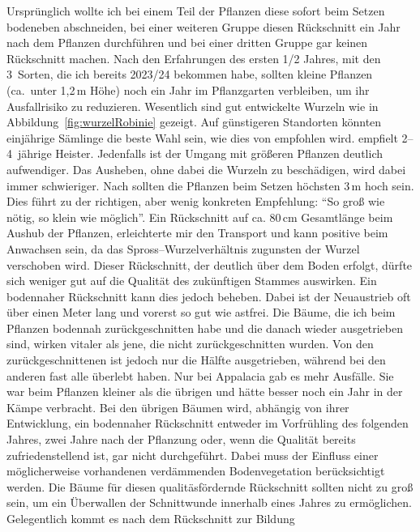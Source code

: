 \documentclass[twocolumn]{scrartcl}
\begin{document}
Ursprünglich wollte ich bei einem Teil der Pflanzen diese sofort beim
Setzen bodeneben abschneiden, bei einer weiteren Gruppe diesen
Rückschnitt ein Jahr nach dem Pflanzen durchführen und bei einer
dritten Gruppe gar keinen Rückschnitt machen. Nach den Erfahrungen des
ersten 1/2 Jahres, mit den 3~Sorten, die ich bereits 2023/24 bekommen
habe, sollten kleine Pflanzen (ca.\ unter 1,2\,m Höhe) noch ein Jahr
im Pflanzgarten verbleiben, um ihr Ausfallrisiko zu
reduzieren. Wesentlich sind gut entwickelte Wurzeln wie in
Abbildung~\ref{fig:wurzelRobinie} gezeigt. Auf günstigeren Standorten
könnten einjährige Sämlinge die beste Wahl sein, wie dies von
\citet{ciuvat2022robinieRumaenien} empfohlen wird.
\citet[S.~51]{fekete1931robinieErtragstafel} empfielt 2--4~jährige Heister.
Jedenfalls ist
der Umgang mit größeren Pflanzen deutlich aufwendiger.  Das Ausheben,
ohne dabei die Wurzeln zu beschädigen, wird dabei immer schwieriger.
Nach \citet{fuehrer2005robinie} sollten die Pflanzen beim Setzen
höchsten 3\,m hoch sein.
Dies führt zu der richtigen, aber wenig konkreten Empfehlung:
\enquote{So groß wie nötig, so klein wie möglich}. Ein Rückschnitt
auf ca. 80\,cm Gesamtlänge beim Aushub der Pflanzen, erleichterte mir
den Transport und kann positive beim Anwachsen sein, da das
Spross--Wurzelverhältnis zugunsten der Wurzel verschoben wird.  Dieser
Rückschnitt, der deutlich über dem Boden erfolgt, dürfte sich weniger
gut auf die Qualität des zukünftigen Stammes auswirken.  Ein
bodennaher Rückschnitt kann dies jedoch beheben. Dabei ist der
Neuaustrieb oft über einen Meter lang und vorerst so gut wie astfrei.
Die Bäume, die ich beim Pflanzen bodennah zurückgeschnitten habe und
die danach wieder ausgetrieben sind, wirken vitaler als jene, die
nicht zurückgeschnitten wurden. Von den zurückgeschnittenen ist jedoch
nur die Hälfte ausgetrieben, während bei den anderen fast alle
überlebt haben. Nur bei Appalacia gab es mehr Ausfälle. Sie war beim
Pflanzen kleiner als die übrigen und hätte besser noch ein Jahr in der
Kämpe verbracht.
Bei den übrigen Bäumen wird, abhängig von ihrer Entwicklung, ein
bodennaher Rückschnitt entweder im Vorfrühling des folgenden Jahres,
zwei Jahre nach der Pflanzung oder, wenn die Qualität bereits
zufriedenstellend ist, gar nicht durchgeführt.
Dabei muss der Einfluss einer möglicherweise
vorhandenen verdämmenden Bodenvegetation berücksichtigt werden. Die
Bäume für diesen qualitäsfördernde Rückschnitt sollten nicht zu groß
sein, um ein Überwallen der Schnittwunde innerhalb eines Jahres zu
ermöglichen. Gelegentlich kommt es nach dem Rückschnitt zur Bildung
\end{document}
